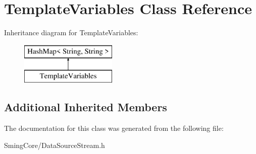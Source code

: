 \hypertarget{class_template_variables}{}\section{Template\+Variables Class Reference}
\label{class_template_variables}
Inheritance diagram for Template\+Variables\+:\begin{figure}[H]
\begin{center}
\leavevmode
\includegraphics[height=2.000000cm]{class_template_variables}
\end{center}
\end{figure}
\subsection*{Additional Inherited Members}


The documentation for this class was generated from the following file\+:\begin{DoxyCompactItemize}
\item 
Sming\+Core/Data\+Source\+Stream.\+h\end{DoxyCompactItemize}
